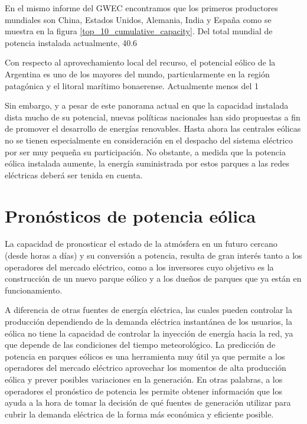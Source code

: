 En el mismo informe del GWEC encontramos que los primeros productores mundiales son China, Estados Unidos, Alemania, India y España como se muestra en la figura \ref{top_10_cumulative_capacity}.
Del total mundial de potencia instalada actualmente, 40.6%

Con respecto al aprovechamiento local del recurso, el potencial eólico de la Argentina es uno de los mayores del mundo, particularmente en la región patagónica y el litoral marítimo bonaerense.
Actualmente menos del 1%

Sin embargo, y a pesar de este panorama actual en que la capacidad instalada dista mucho de su potencial, nuevas políticas nacionales han sido propuestas a fin de promover el desarrollo de energías renovables.
Hasta ahora las centrales eólicas no se tienen especialmente en consideración en el despacho del sistema eléctrico por ser muy pequeña su participación. No obstante, a medida que la potencia eólica instalada aumente, la energía suministrada por estos parques a las redes eléctricas deberá ser tenida en cuenta.


\section{Pronósticos de potencia eólica}

La capacidad de pronosticar el estado de la atmósfera en un futuro cercano (desde horas a días) y su conversión a potencia, resulta de gran interés tanto a los operadores del mercado eléctrico, como a los inversores cuyo objetivo es la construcción de un nuevo parque eólico y a los dueños de parques que ya están en funcionamiento.

A diferencia de otras fuentes de energía eléctrica, las cuales pueden controlar la producción dependiendo de la demanda eléctrica instantánea de los usuarios, la eólica no tiene la capacidad de controlar la inyección de energía hacia la red, ya que depende de las condiciones del tiempo meteorológico.
La predicción de potencia en parques eólicos es una herramienta muy útil ya que permite a los operadores del mercado eléctrico aprovechar los momentos de alta producción eólica y prever posibles variaciones en la generación.
En otras palabras, a los operadores el pronóstico de potencia les permite obtener información que los ayuda a la hora de tomar la decisión de qué fuentes de generación utilizar para cubrir la demanda eléctrica de la forma más económica y eficiente posible.

